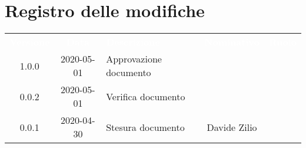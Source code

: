 \section*{Registro delle modifiche}
{
	\centering
	\begin{longtable}{ c c  C{4cm}  c  c }
		\textcolor{white}{\textbf{Versione}} & \textcolor{white}{\textbf{Data}} & \textcolor{white}{\textbf{Descrizione}} & \textcolor{white}{\textbf{Nominativo}} & \textcolor{white}{\textbf{Ruolo}}\\		
		1.0.0 & 2020-05-01 & Approvazione documento &  &\RdP{}\\		
		0.0.2 & 2020-05-01 & Verifica documento & &\ver{}\\		
		0.0.1 & 2020-04-30 & Stesura documento & Davide Zilio &\reda{}\\		
		
	\end{longtable}

}